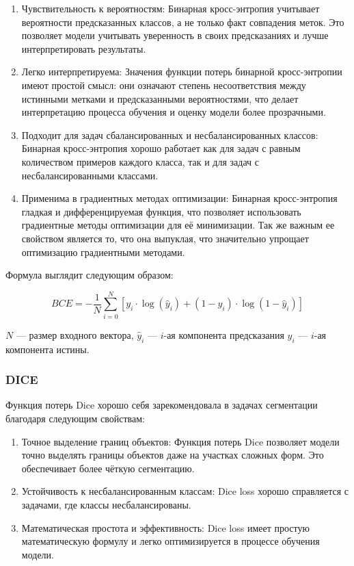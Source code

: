 \begin{enumerate}
	\item Чувствительность к вероятностям: Бинарная кросс-энтропия учитывает
	вероятности предсказанных классов, а не только факт совпадения меток. Это
	позволяет модели учитывать уверенность в своих предсказаниях и лучше
	интерпретировать результаты.

	\item Легко интерпретируема: Значения функции потерь бинарной
	кросс-энтропии имеют простой смысл: они означают степень несоответствия
	между истинными метками и предсказанными вероятностями, что делает
	интерпретацию процесса обучения и оценку модели более прозрачными.

	\item Подходит для задач сбалансированных и несбалансированных классов:
	Бинарная кросс-энтропия хорошо работает как для задач с равным количеством
	примеров каждого класса, так и для задач с несбалансированными классами.

	\item Применима в градиентных методах оптимизации: Бинарная кросс-энтропия
	гладкая и дифференцируемая функция, что позволяет использовать градиентные
	методы оптимизации для её минимизации. Так же важным ее свойством является
	то, что она выпуклая, что значительно упрощает оптимизацию градиентными
	методами.


\end{enumerate}

Формула выглядит следующим образом:

\begin{equation}
	BCE = - \frac{1}{N} \sum_{i=0}^{N} \left[ y_i \cdot \log(\hat{y}_i) + (1 - y_i)
	\cdot \log(1 - \hat{y}_i) \right]
	\label{eq:bce}
\end{equation}

\noindent $N$ --- размер входного вектора, $\hat{y}_i$ --- $i$-ая компонента предсказания
$y_i$ --- $i$-ая компонента истины.


\subsubsection{DICE}

Функция потерь Dice хорошо себя зарекомендовала в задачах сегментации благодаря
следующим свойствам:

\begin{enumerate}

	\item Точное выделение границ объектов: Функция потерь Dice позволяет
	модели точно выделять границы объектов даже на участках сложных форм. Это
	обеспечивает более чёткую сегментацию.

	\item Устойчивость к несбалансированным классам: Dice loss хорошо
	справляется с задачами, где классы несбалансированы.

	\item Математическая простота и эффективность: Dice loss имеет простую
	математическую формулу и легко оптимизируется в процессе обучения модели.

\end{enumerate}


